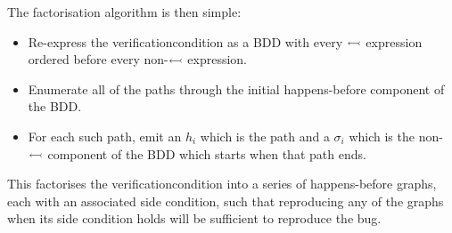 \newpage
The factorisation algorithm is then simple:
\begin{itemize}
\item Re-express the \gls{verificationcondition} as a BDD with every
  $\leftarrowtail$ expression ordered before every
  non-$\leftarrowtail$ expression.
\item Enumerate all of the paths through the initial happens-before
  component of the BDD.
\item For each such path, emit an $h_i$ which is the path and a
  $\sigma_i$ which is the non-$\leftarrowtail$ component of the
  BDD which starts when that path ends.
\end{itemize}
This factorises the \gls{verificationcondition} into a series of
happens-before graphs, each with an associated side condition, such
that reproducing any of the graphs when its side condition holds will
be sufficient to reproduce the bug.

